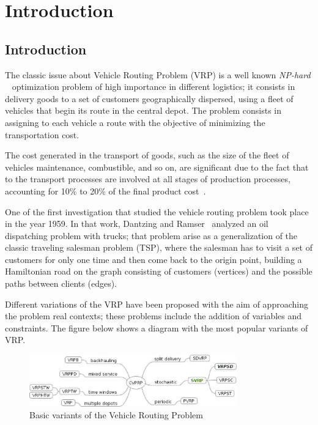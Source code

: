 \chapter{Introduction}
\label{chap:intro}


\section{Introduction}

The classic issue about Vehicle Routing Problem (VRP) is a well known \textit{NP-hard} ~\cite{Lenstra_1981} optimization problem of high importance in different logistics; it consists in delivery goods to a set of customers geographically dispersed, using a fleet of vehicles that begin its route in the central depot. The problem consists in assigning to each vehicle a route with the objective of minimizing the transportation cost.

The cost generated in the transport of goods, such as the size of the fleet of vehicles maintenance, combustible, and so on, are significant due to the fact that to the transport processes are involved at all stages of production processes, accounting for 10\% to 20\% of the final product cost~\cite{toth_vehicle_2001}.

One of the first investigation that studied the vehicle routing problem took place in the year 1959. In that work, Dantzing and Ramser~\cite{Dantzing1959} analyzed an oil dispatching problem with trucks; that problem arise as a generalization of the classic traveling salesman problem (TSP), where the salesman has to visit a set of customers for only one time and then come back to the origin point, building a Hamiltonian road on the graph consisting of customers (vertices) and the possible paths between clients (edges).

Different variations of the VRP have been proposed with the aim of approaching the problem real contexts; these problems include the addition of variables and constraints. The figure below shows a diagram with the most popular variants of VRP.

\begin{figure}[!htbp]
  \begin{center}
    \includegraphics[width=0.8\textwidth]{Images/Chapter1/variants_vrp.eps}
  \end{center}
  \caption{Basic variants of the Vehicle Routing Problem}
  \label{fig:VRP_variants}
\end{figure}

